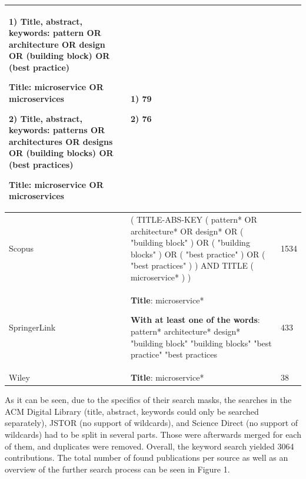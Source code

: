 \documentclass[conference]{IEEEtran}
\begin{document}
\begin{table}[h]
\begin{tabular}{|p{5cm}|p{10cm}|p{2cm}|}
        1) \textbf{Title, abstract, keywords}: pattern OR architecture OR design OR (building block) OR (best practice)

           \textbf{Title}: microservice OR microservices

        2) \textbf{Title, abstract, keywords}: patterns OR architectures OR designs OR (building blocks) OR (best practices)

            \textbf{Title}: microservice OR microservices
        & 
        1) 79

        2) 76
        \\ 

        \hline

        Scopus & ( TITLE-ABS-KEY ( pattern*  OR  architecture*  OR  design*  OR  ( "building block" )  OR  ( "building blocks" )  OR  ( "best practice" )  OR  ( "best practices" ) )  AND  TITLE ( microservice* ) ) & 1534 \\ 
        \hline

        SpringerLink & \textbf{Title}: microservice*


        \textbf{With at least one of the words}: pattern* architecture* design* "building block" "building blocks" "best practice" "best practices
         & 433 \\ 
        \hline

        Wiley & \textbf{Title}: microservice* & 38 \\ 

        \hline
    \end{tabular}
    
    \label{searchTerms}
\end{table}

As it can be seen, due to the specifics of their search masks, the searches in the ACM Digital Library (title, abstract, keywords could only be searched separately), JSTOR (no support of wildcards), and Science Direct (no support of wildcards) had to be split in several parts. Those were afterwards merged for each of them, and duplicates were removed. Overall, the keyword search yielded 3064 contributions. The total number of found publications per source as well as an overview of the further search process can be seen in Figure 1.
\end{document}
